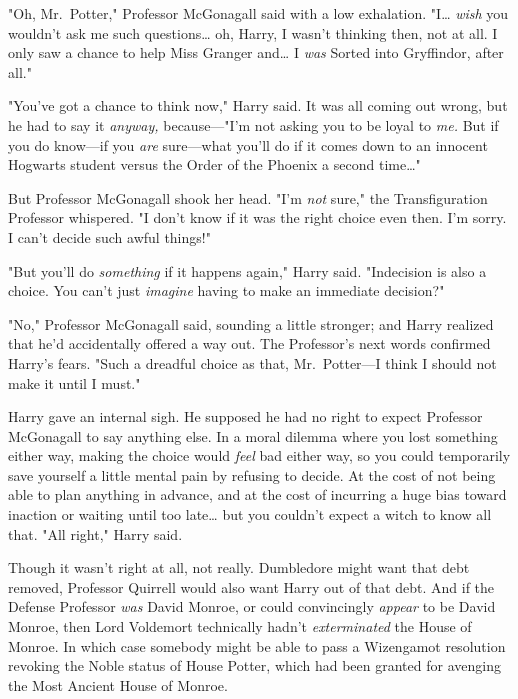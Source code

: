 "Oh, Mr.~Potter," Professor McGonagall said with a low exhalation. "I{\ldots} 
\emph{wish} you wouldn't ask me such questions{\ldots} oh, Harry, I wasn't 
thinking then, not at all. I only saw a chance to help Miss Granger and{\ldots} 
I \emph{was} Sorted into Gryffindor, after all."

"You've got a chance to think now," Harry said. It was all coming out wrong, 
but he had to say it \emph{anyway,} because---"I'm not asking you to be loyal 
to \emph{me.} But if you do know---if you \emph{are} sure---what you'll do if 
it comes down to an innocent Hogwarts student versus the Order of the Phoenix a 
second time{\ldots}"

But Professor McGonagall shook her head. "I'm \emph{not} sure," the 
Transfiguration Professor whispered. "I don't know if it was the right choice 
even then. I'm sorry. I can't decide such awful things!"

"But you'll do \emph{something} if it happens again," Harry said. "Indecision 
is also a choice. You can't just \emph{imagine} having to make an immediate 
decision?"

"No," Professor McGonagall said, sounding a little stronger; and Harry realized 
that he'd accidentally offered a way out. The Professor's next words confirmed 
Harry's fears. "Such a dreadful choice as that, Mr.~Potter---I think I should 
not make it until I must."

Harry gave an internal sigh. He supposed he had no right to expect Professor 
McGonagall to say anything else. In a moral dilemma where you lost something 
either way, making the choice would \emph{feel} bad either way, so you could 
temporarily save yourself a little mental pain by refusing to decide. At the 
cost of not being able to plan anything in advance, and at the cost of 
incurring a huge bias toward inaction or waiting until too late{\ldots} but you 
couldn't expect a witch to know all that. "All right," Harry said.

Though it wasn't right at all, not really. Dumbledore might want that debt 
removed, Professor Quirrell would also want Harry out of that debt. And if the 
Defense Professor \emph{was} David Monroe, or could convincingly \emph{appear} 
to be David Monroe, then Lord Voldemort technically hadn't \emph{exterminated} 
the House of Monroe. In which case somebody might be able to pass a Wizengamot 
resolution revoking the Noble status of House Potter, which had been granted 
for avenging the Most Ancient House of Monroe.

